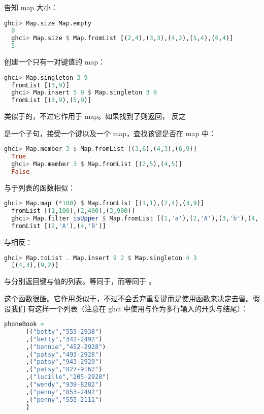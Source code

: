 \documentclass[./main.tex]{subfiles}
\begin{document}
告知 map 大小：

\begin{lstlisting}[language=Haskell]
  ghci> Map.size Map.empty
  0
  ghci> Map.size $ Map.fromList [(2,4),(3,3),(4,2),(5,4),(6,4)]
  5
\end{lstlisting}

创建一个只有一对键值的 map：

\begin{lstlisting}[language=Haskell]
  ghci> Map.singleton 3 9
  fromList [(3,9)]
  ghci> Map.insert 5 9 $ Map.singleton 3 9
  fromList [(3,9),(5,9)]
\end{lstlisting}

类似于的，不过它作用于 map。如果找到了则返回，
反之

是一个子句，接受一个键以及一个 map，查找该键是否在 map 中：

\begin{lstlisting}[language=Haskell]
  ghci> Map.member 3 $ Map.fromList [(3,6),(4,3),(6,9)]
  True
  ghci> Map.member 3 $ Map.fromList [(2,5),(4,5)]
  False
\end{lstlisting}

与于列表的函数相似：

\begin{lstlisting}[language=Haskell]
  ghci> Map.map (*100) $ Map.fromList [(1,1),(2,4),(3,9)]
  fromList [(1,100),(2,400),(3,900)]
  ghci> Map.filter isUpper $ Map.fromList [(1,'a'),(2,'A'),(3,'b'),(4,'B')]
  fromList [(2,'A'),(4,'B')]
\end{lstlisting}

与相反：

\begin{lstlisting}[language=Haskell]
  ghci> Map.toList . Map.insert 9 2 $ Map.singleton 4 3
  [(4,3),(9,2)]
\end{lstlisting}

与分别返回键与值的列表。等同于，而等同于
。

这个函数很酷。它作用类似于，不过不会丢弃重复键而是使用函数来决定去留。假设我们
有这样一个列表（注意在 ghci 中使用\acode{:\{}与\acode{:\}}作为多行输入的开头与结尾）：

\begin{lstlisting}[language=Haskell]
  phoneBook =
      [("betty","555-2938")
      ,("betty","342-2492")
      ,("bonnie","452-2928")
      ,("patsy","493-2928")
      ,("patsy","943-2929")
      ,("patsy","827-9162")
      ,("lucille","205-2928")
      ,("wendy","939-8282")
      ,("penny","853-2492")
      ,("penny","555-2111")
      ]
\end{lstlisting}
\end{document}
